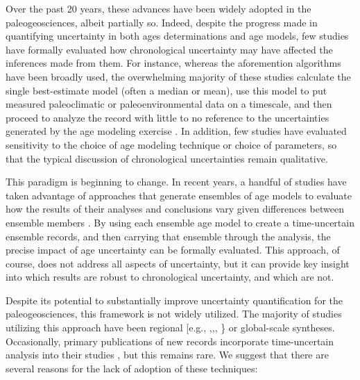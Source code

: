 \documentclass[gchron, manuscript]{copernicus}
\begin{document}
Over the past 20 years, these advances have been widely adopted in the paleogeosciences, albeit partially so.
Indeed, despite the progress made in quantifying uncertainty in both ages determinations and age models, few studies have formally evaluated how chronological uncertainty may have affected the inferences made from them.
For instance, whereas the aforemention algorithms have been broadly used, the overwhelming majority of these studies calculate the single best-estimate model (often a median or mean), use this model to put measured paleoclimatic or paleoenvironmental data on a timescale, and then proceed to analyze the record with little to no reference to the uncertainties generated by the age modeling exercise \citep[\citet{McKay2009}]{McKay2008}.
In addition, few studies have evaluated sensitivity to the choice of age modeling technique or choice of parameters, so that the typical discussion of chronological uncertainties remain qualitative.

This paradigm is beginning to change.
In recent years, a handful of studies have taken advantage of approaches that generate ensembles of age models to evaluate how the results of their analyses and conclusions vary given differences between ensemble members \citep[\citet{Rhines_JGR2011},\citet{Anchukaitis_Tierney2012}, \citet{Tierney2013}, update this list with newer refs]{Haam_Huybers2010}.
By using each ensemble age model to create a time-uncertain ensemble records, and then carrying that ensemble through the analysis, the precise impact of age uncertainty can be formally evaluated.
This approach, of course, does not address all aspects of uncertainty, but it can provide key insight into which results are robust to chronological uncertainty, and which are not.

Despite its potential to substantially improve uncertainty quantification for the paleogeosciences, this framework is not widely utilized.
The majority of studies utilizing this approach have been regional {[}e.g., \citet{Anchukaitis_Tierney2012},\citet{Tierney2013},\citet{mckay_onset_2018}, \citet{routson2018}\} or global-scale \citep[e.g.,][\citet{Marcott_Science2013},\citet{kaufman2020HoloceneGMST}]{Shakun_Nature2012} syntheses.
Occasionally, primary publications of new records incorporate time-uncertain analysis into their studies \citep[more]{Boldt2015}, but this remains rare.
We suggest that there are several reasons for the lack of adoption of these techniques:
\end{document}

